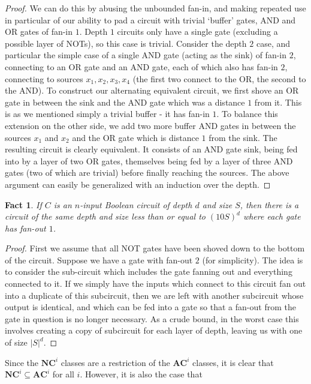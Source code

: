 \documentclass{article}
\theoremstyle{definition}
\theoremstyle{plain}
\theoremstyle{theorem}
\newtheorem{fact}{Fact}[section]
\begin{document}
\begin{proof}
	We can do this by abusing the unbounded fan-in, and making repeated use in particular of our ability to pad a circuit with trivial `buffer' gates, AND and OR gates of fan-in $1$. Depth $1$ circuits only have a single gate (excluding a possible layer of NOTs), so this case is trivial. Consider the depth $2$ case, and particular the simple case of a single AND gate (acting as the sink) of fan-in $2$, connecting to an OR gate and an AND gate, each of which also has fan-in $2$, connecting to sources $x_1,x_2,x_3,x_4$ (the first two connect to the OR, the second to the AND). To construct our alternating equivalent circuit, we first shove an OR gate in between the sink and the AND gate which was a distance $1$ from it. This is as we mentioned simply a trivial buffer - it has fan-in $1$. To balance this extension on the other side, we add two more buffer AND gates in between the sources $x_1$ and $x_2$ and the OR gate which is distance $1$ from the sink. The resulting circuit is clearly equivalent. It consists of an AND gate sink, being fed into by a layer of two OR gates, themselves being fed by a layer of three AND gates (two of which are trivial) before finally reaching the sources. The above argument can easily be generalized with an induction over the depth. \par 
\end{proof}
\begin{fact}
	If $C$ is an $n$-input Boolean circuit of depth $d$ and size $S$, then there is a circuit of the same depth and size less than or equal to $(10S)^d$ where each gate has fan-out $1$. 
\end{fact}
\begin{proof}
	First we assume that all NOT gates have been shoved down to the bottom of the circuit. Suppose we have a gate with fan-out $2$ (for simplicity). The idea is to consider the sub-circuit which includes the gate fanning out and everything connected to it. If we simply have the inputs which connect to this circuit fan out into a duplicate of this subcircuit, then we are left with another subcircuit whose output is identical, and which can be fed into a gate so that a fan-out from the gate in question is no longer necessary. As a crude bound, in the worst case this involves creating a copy of subcircuit for each layer of depth, leaving us with one of size $|S|^d$.
\end{proof}
Since the $\bm{NC}^i$ classes are a restriction of the $\bm{AC}^i$ classes, it is clear that $\bm{NC}^i \subseteq \bm{AC}^i$ for all $i$. However, it is also the case that
\end{document}
